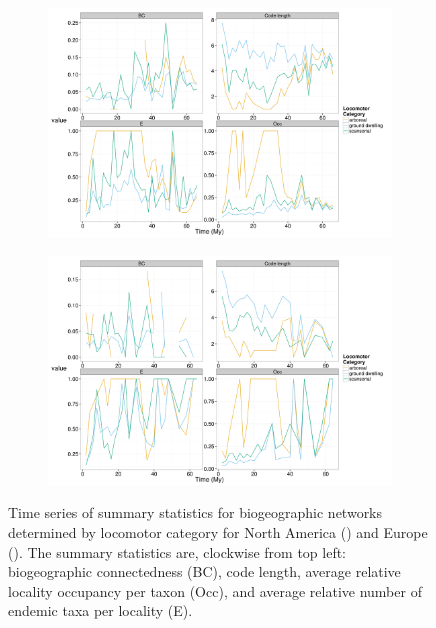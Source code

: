 \documentclass[12pt,letterpaper]{article}
\begin{document}
\begin{figure}[ht]
  \begin{center}
    \begin{subfigure}[b]{0.4\textwidth}
      \caption{}
      \includegraphics[width = \textwidth, keepaspectratio = true]{figure/na_lf}
      \label{subfig:loco_con_na}
    \end{subfigure}
    \begin{subfigure}[b]{0.4\textwidth}
      \caption{}
      \includegraphics[width = \textwidth, keepaspectratio = true]{figure/er_lf}
      \label{subfig:loco_con_er}
    \end{subfigure}
  \end{center}
  \caption[Locomotor category based community connectedness]{Time series of summary statistics for biogeographic networks determined by locomotor category for North America () and Europe (). The summary statistics are, clockwise from top left: biogeographic connectedness (BC), code length, average relative locality occupancy per taxon (Occ), and average relative number of endemic taxa per locality (E).} 
  \label{fig:loco_con}
\end{figure}
\end{document}
